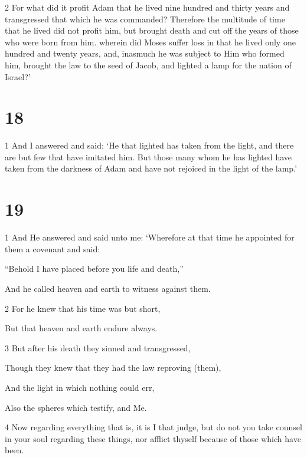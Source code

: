 \par 2 For what did it profit Adam that he lived nine hundred and thirty years and transgressed that which he was commanded? Therefore the multitude of time that he lived did not profit him, but brought death and cut off the years of those who were born from him. wherein did Moses suffer loss in that he lived only one hundred and twenty years, and, inasmuch he was subject to Him who formed him, brought the law to the seed of Jacob, and lighted a lamp for the nation of Israel?’

\chapter{18}

\par 1 And I answered and said: ‘He that lighted has taken from the light, and there are but few that have imitated him. But those many whom he has lighted have taken from the darkness of Adam and have not rejoiced in the light of the lamp.’

\chapter{19}

\par 1 And He answered and said unto me: ‘Wherefore at that time he appointed for them a covenant and said:

\par “Behold I have placed before you life and death,”

\par And he called heaven and earth to witness against them.

\par 2 For he knew that his time was but short,

\par But that heaven and earth endure always.

\par 3 But after his death they sinned and transgressed,

\par Though they knew that they had the law reproving (them),

\par And the light in which nothing could err,

\par Also the spheres which testify, and Me.

\par 4 Now regarding everything that is, it is I that judge, but do not you take counsel in your soul regarding these things, nor afflict thyself because of those which have been. 

